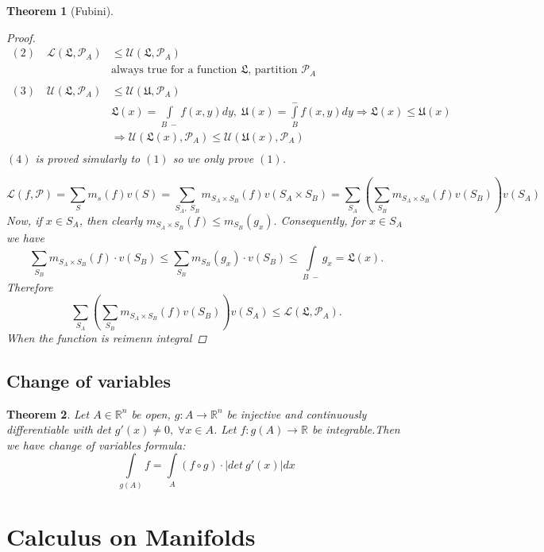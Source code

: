 \documentclass[11pt]{article}
\def\RR{\mathbb{R}}
\newtheorem{theorem}{Theorem}[section]
\begin{document}
\begin{theorem}[Fubini]
\begin{proof}
\begin{align*}
(2) \quad \mathcal{L}(\mathfrak{L},\mathcal{P}_A) &\leq \mathcal{U}(\mathfrak{L},\mathcal{P}_A) \\ &\text{always true for  a function $\mathfrak{L}$, partition $\mathcal{P}_A$} \\ \;& \; \\
(3) \quad \mathcal{U}(\mathfrak{L},\mathcal{P}_A) &\leq \mathcal{U}(\mathfrak{U},\mathcal{P}_A)\\
&\mathfrak{L}(x)  =\int\limits_{B \;-}f(x,y)dy, \; \mathfrak{U}(x)  =\int\limits_{B}^{-}f(x,y)dy \Rightarrow \mathfrak{L}(x) \leq \mathfrak{U}(x) \\
 &\Rightarrow \mathcal{U}(\mathfrak{L}(x), \mathcal{P}_A) \leq \mathcal{U}(\mathfrak{U}(x), \mathcal{P}_A) \\
\end{align*}
$(4)$ is proved simularly to $(1)$ so we only prove $(1)$. 

\[\mathcal{L}(f,\mathcal{P})= \sum_{S}m_{s}(f) v(S) = \sum_{S_A, \; S_B}\! m_{S_A \times S_B}(f)  v(S_A \times S_B) = \sum_{S_A}\left(\sum_{S_B} m_{S_A \times S_B}(f)  v(S_B) \right)\! v(S_A)\]
Now, if $x \in S_A$, then clearly $m_{S_A \times S_B}(f) \leq m_{S_B}(g_x).$ Consequently, for $x \in S_A$ we have
\[\sum_{S_B} m_{S_A \times S_B}(f) \cdot v(S_B) \leq \sum_{S_B}m_{S_B}(g_x)\cdot v(S_B) \leq \int\limits_{B \;-}g_x = \mathfrak{L}(x).\]
Therefore
\[\sum_{S_A}\left(\sum_{S_B} m_{S_A \times S_B}(f)  v(S_B) \right)\! v(S_A) \leq \mathcal{L}(\mathfrak{L}, \mathcal{P}_A).\]
When the function is reimenn integral
\end{proof}
\end{theorem}

\subsection{Change of variables}
\begin{theorem}
Let $A \in \RR^n$ be open, $g:A \rightarrow \RR^n$ be injective and continuously differentiable with $det \;g'(x) \neq 0, \; \forall x \in A$. Let $f:g(A) \rightarrow \RR$ be integrable.Then we have change of variables formula:
\[\int\limits_{g(A)}\!f=\int\limits_{A}(f \circ g)\cdot |det \:g'(x)|dx\]
\end{theorem}

\section{Calculus on Manifolds}
\end{document}
